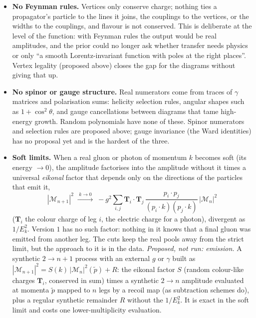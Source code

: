 \documentclass[11pt]{article}
\begin{document}
\begin{itemize}
  \item \textbf{No Feynman rules.} Vertices only conserve charge; nothing ties a propagator's particle to the lines it
    joins, the couplings to the vertices, or the widths to the couplings, and flavour is not conserved. This is
    deliberate at the level of the function: with Feynman rules the output would be real amplitudes, and the prior
    could no longer ask whether transfer needs physics or only ``a smooth Lorentz-invariant function with poles at the
    right places''. Vertex legality (proposed above) closes the gap for the diagrams without giving that up.
  \item \textbf{No spinor or gauge structure.} Real numerators come from traces of $\gamma$ matrices and polarisation
    sums: helicity selection rules, angular shapes such as $1+\cos^2\theta$, and gauge cancellations between diagrams
    that tame high-energy growth. Random polynomials have none of these. Spinor numerators and selection rules are
    proposed above; gauge invariance (the Ward identities) has no proposal yet and is the hardest of the three.
  \item \textbf{Soft limits.} When a real gluon or photon of momentum $k$ becomes soft (its energy $\to0$), the amplitude
    factorises into the amplitude without it times a universal \emph{eikonal} factor that depends only on the
    directions of the particles that emit it,
    \begin{equation*}
      |\mathcal M_{n+1}|^2\;\xrightarrow{\;k\to0\;}\;-g^2\sum_{i,j}\mathbf T_i\!\cdot\!\mathbf T_j\,
      \frac{p_i\!\cdot\!p_j}{(p_i\!\cdot\!k)(p_j\!\cdot\!k)}\,|\mathcal M_n|^2
    \end{equation*}
    ($\mathbf T_i$ the colour charge of leg $i$, the electric charge for a photon), divergent as $1/E_k^2$. Version $1$
    has no such factor: nothing in it knows that a final gluon was emitted from another leg. The cuts keep the real
    pools away from the strict limit, but the approach to it is in the data.
    \emph{Proposed, not run: emission.} A synthetic $2\to n{+}1$ process with an external $g$ or $\gamma$ built as
    $|\mathcal M_{n+1}|^2=S(k)\,|\mathcal M_n|^2(\tilde p)+R$: the eikonal factor $S$ (random colour-like charges
    $\mathbf T_i$, conserved in sum) times a synthetic $2\to n$ amplitude evaluated at momenta $\tilde p$ mapped to $n$
    legs by a recoil map (as subtraction schemes do), plus a regular synthetic remainder $R$ without the $1/E_k^2$.
    It is exact in the soft limit and costs one lower-multiplicity evaluation.

\end{itemize}
\end{document}
